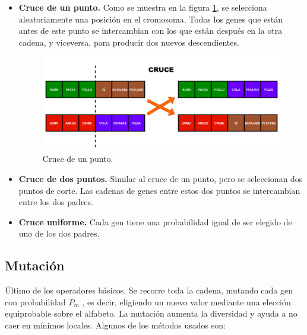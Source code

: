 \begin{itemize}
  \item \textbf{Cruce de un punto.} Como se muestra en la figura \ref{fig:cruce}, se selecciona aleatoriamente una posición en el cromosoma. Todos los genes que están antes de este punto se intercambian con los que están después en la otra cadena, y viceversa, para producir dos nuevos descendientes.
  
  \begin{figure}[H]
    \centering
    \includegraphics[width=1\textwidth]{figures/cruce.png}
    \caption{Cruce de un punto.}
    \label{fig:cruce}
  \end{figure}

  \item \textbf{Cruce de dos puntos.} Similar al cruce de un punto, pero se seleccionan dos puntos de corte. Las cadenas de genes entre estos dos puntos se intercambian entre los dos padres.
  \item \textbf{Cruce uniforme.} Cada gen tiene una probabilidad igual de ser elegido de uno de los dos padres.
\end{itemize}

\subsection{Mutación}

Último de los operadores básicos. Se recorre toda la cadena, mutando cada gen con probabilidad \(P_m\) , es decir, eligiendo un nuevo valor mediante una elección equiprobable sobre el alfabeto. La mutación aumenta la diversidad y ayuda a no caer en mínimos locales. Algunos de los métodos usados son:

